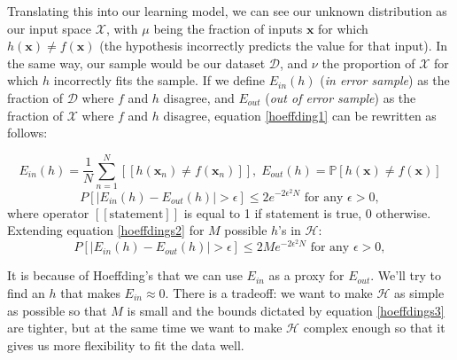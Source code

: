 \documentclass[11pt]{article}
\begin{document}
Translating this into our learning model, we can see our unknown distribution as our input space $\mathcal{X}$, with $\mu$ being the fraction of inputs $\mathbf{x}$ for which $h(\mathbf{x})\neq f(\mathbf{x})$ (the hypothesis incorrectly predicts the value for that input). In the same way, our sample would be our dataset $\mathcal{D}$, and $\nu$ the proportion of $\mathcal{X}$ for which $h$ incorrectly fits the sample. If we define $E_{in}(h)$ (\emph{in error sample}) as the fraction of $\mathcal{D}$ where $f$ and $h$ disagree, and $E_{out}$ (\emph{out of error sample}) as the fraction of $\mathcal{X}$ where $f$ and $h$ disagree, equation \ref{hoeffding1} can be rewritten as follows:


$$E_{in}(h)=\frac{1}{N}\sum_{n=1}^N[[h(\mathbf{x}_n)\neq f(\mathbf{x}_n)]],\; E_{out}(h)=\mathbb{P}[h(\mathbf{x})\neq f(\mathbf{x})]$$
\begin{equation}
P[|E_{in}(h)-E_{out}(h)|>\epsilon]\leq 2e^{-2\epsilon^2N}\text{ for any $\epsilon > 0$},
\label{hoeffdings2}
\end{equation}
where operator $[[\text{statement}]]$ is equal to 1 if statement is true, 0 otherwise. Extending equation \ref{hoeffdings2} for $M$ possible $h$'s in $\mathcal{H}$:
\begin{equation}
P[|E_{in}(h)-E_{out}(h)|>\epsilon]\leq 2Me^{-2\epsilon^2N}\text{ for any $\epsilon > 0$},
\label{hoeffdings3}
\end{equation}

It is because of Hoeffding's that we can use $E_{in}$ as a proxy for $E_{out}$. We'll try to find an $h$ that makes $E_{in}\approx0$. There is a tradeoff: we want to make $\mathcal{H}$ as simple as possible so that $M$ is small and the bounds dictated by equation \ref{hoeffdings3} are tighter, but at the same time we want to make $\mathcal{H}$ complex enough so that it gives us more flexibility to fit the data well.
\end{document}
